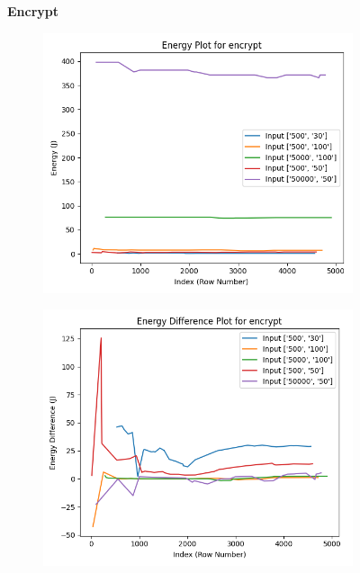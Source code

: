 \documentclass[times, 10pt,twocolumn]{article}
\begin{document}
\begin{figure}[ht]
   \textbf{Encrypt}\par\medskip
   \begin{subfigure}[b]{0.22\textwidth}
      \includegraphics[width=\textwidth]{imgs/final_experiment_plots/model_analysis/measurement_data_analysis/encrypt_energy.png}
     \caption{}
     \label{fig:encrypt_energy}
   \end{subfigure}
   \hfill
   \begin{subfigure}[b]{0.22\textwidth}
      \includegraphics[width=\textwidth]{imgs/final_experiment_plots/model_analysis/measurement_data_analysis/encrypt_energy_diff.png}

\end{subfigure}
\end{figure}
\end{document}
